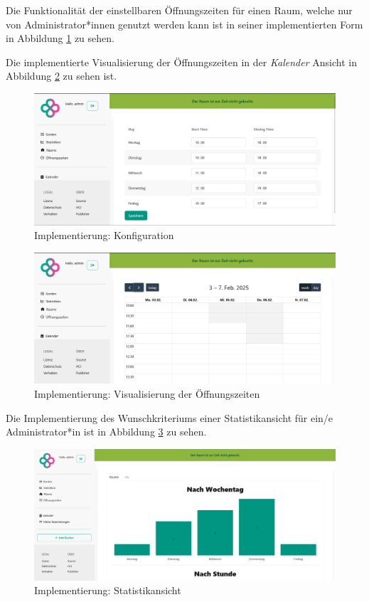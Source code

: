 Die Funktionalität der einstellbaren Öffnungszeiten für einen Raum, welche nur von Administrator*innen genutzt werden kann
ist in seiner implementierten Form in Abbildung \ref{fig:impl-adminopeninghours_config} zu sehen.

Die implementierte Visualisierung der Öffnungszeiten in der \textit{Kalender} Ansicht in Abbildung \ref{fig:impl-adminopeninghours} zu sehen ist.

\begin{figure}[ht]
    \centering
    \includegraphics[width=\textwidth]{figures/impl-views/admin_opening_hours}
    \caption{Implementierung: Konfiguration}
    \label{fig:impl-adminopeninghours_config}
\end{figure}
\begin{figure}[ht]
    \centering
    \includegraphics[width=\textwidth]{figures/impl-views/calendar_opening_hours}
    \caption{Implementierung: Visualisierung der Öffnungszeiten}
    \label{fig:impl-adminopeninghours}
\end{figure}
\clearpage

Die Implementierung des Wunschkriteriums einer Statistikansicht für ein/e Administrator*in ist in Abbildung \ref{fig:impl-adminstatistic} zu sehen.

\begin{figure}[ht]
    \centering
    \includegraphics[width=\textwidth]{figures/impl-views/admin_statistics}
    \caption{Implementierung: Statistikansicht}
    \label{fig:impl-adminstatistic}
\end{figure}
